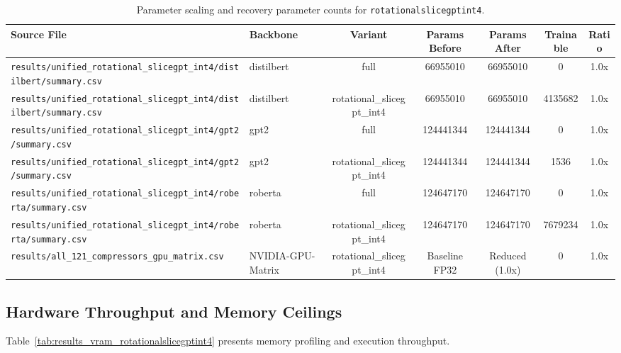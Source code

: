 \begin{table}[t]
\centering
\small
\begin{tabular}{llccccc}
\toprule
\textbf{Source File} & \textbf{Backbone} & \textbf{Variant} & \textbf{Params Before} & \textbf{Params After} & \textbf{Trainable} & \textbf{Ratio} \\
\midrule
\texttt{results/unified\_rotational\_slicegpt\_int4/distilbert/summary.csv} & distilbert & full & 66955010 & 66955010 & 0 & 1.0x \\
\texttt{results/unified\_rotational\_slicegpt\_int4/distilbert/summary.csv} & distilbert & rotational\_slicegpt\_int4 & 66955010 & 66955010 & 4135682 & 1.0x \\
\texttt{results/unified\_rotational\_slicegpt\_int4/gpt2/summary.csv} & gpt2 & full & 124441344 & 124441344 & 0 & 1.0x \\
\texttt{results/unified\_rotational\_slicegpt\_int4/gpt2/summary.csv} & gpt2 & rotational\_slicegpt\_int4 & 124441344 & 124441344 & 1536 & 1.0x \\
\texttt{results/unified\_rotational\_slicegpt\_int4/roberta/summary.csv} & roberta & full & 124647170 & 124647170 & 0 & 1.0x \\
\texttt{results/unified\_rotational\_slicegpt\_int4/roberta/summary.csv} & roberta & rotational\_slicegpt\_int4 & 124647170 & 124647170 & 7679234 & 1.0x \\
\texttt{results/all\_121\_compressors\_gpu\_matrix.csv} & NVIDIA-GPU-Matrix & rotational\_slicegpt\_int4 & Baseline FP32 & Reduced (1.0x) & 0 & 1.0x \\
\bottomrule
\end{tabular}
\caption{Parameter scaling and recovery parameter counts for \texttt{rotationalslicegptint4}.}
\label{tab:results_params_rotationalslicegptint4}
\end{table}

\subsection{Hardware Throughput and Memory Ceilings}
Table~\ref{tab:results_vram_rotationalslicegptint4} presents memory profiling and execution throughput.


